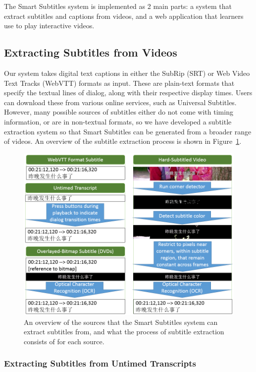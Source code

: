 \documentclass{sigchi}
\begin{document}
The Smart Subtitles system
is implemented as 2 main parts:
a system that extract subtitles and captions from videos,
and a web application that learners use to play interactive videos.

\subsection{Extracting Subtitles from Videos}

Our system takes digital text captions in either the SubRip (SRT) \cite{subrip} or Web Video Text Tracks (WebVTT) formats \cite{webvtt} as input.
These are plain-text formats that specify the textual lines of dialog, along with their respective display times.
Users can download these from
various online services, such as Universal Subtitles.
However, many possible sources of subtitles either
do not come with timing information, or are in
non-textual formats, so we have developed 
a subtitle extraction system so that Smart Subtitles
can be generated from a broader range of videos.
An overview of the subtitle extraction process
is shown in Figure~\ref{fig:figure3}.

\begin{figure}[!h]
\centering
\includegraphics[width=\columnwidth]{subtitle-sources}
\caption{An overview of the sources that the Smart Subtitles system can extract subtitles from, and what the process of subtitle extraction consists of for each source.}
\label{fig:figure3}
\end{figure}

\subsubsection{Extracting Subtitles from Untimed Transcripts}
\end{document}
